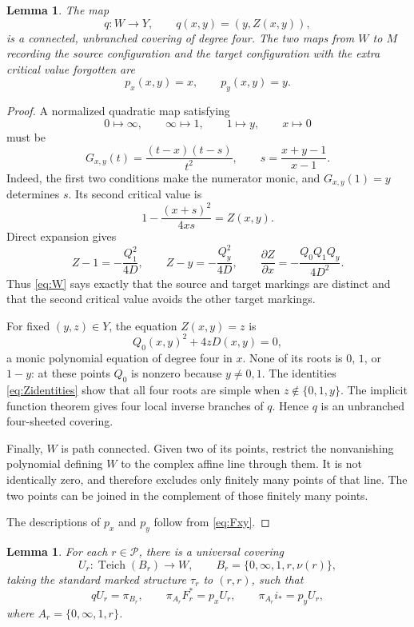 \documentclass[11pt]{article}
\newcommand{\Teich}{\operatorname{Teich}}
\newcommand{\Par}{\mathcal P}
\newtheorem{lemma}[theorem]{Lemma}
\theoremstyle{definition}
\theoremstyle{remark}
\begin{document}
\begin{lemma}\label{lem:cover}
The map
\[
q:W\longrightarrow Y,\qquad q(x,y)=(y,Z(x,y)),
\]
is a connected, unbranched covering of degree four.
The two maps from $W$ to $M$ recording the source configuration and
the target configuration with the extra critical value forgotten are
\[
p_x(x,y)=x,\qquad p_y(x,y)=y.
\]
\end{lemma}

\begin{proof}
A normalized quadratic map satisfying
\[
0\longmapsto\infty,\qquad
\infty\longmapsto1,\qquad
1\longmapsto y,\qquad x\longmapsto0
\]
must be
\begin{equation}\label{eq:Fxy}
G_{x,y}(t)=\frac{(t-x)(t-s)}{t^2},
\qquad s=\frac{x+y-1}{x-1}.
\end{equation}
Indeed, the first two conditions make the numerator monic, and
$G_{x,y}(1)=y$ determines $s$.
Its second critical value is
\[
1-\frac{(x+s)^2}{4xs}=Z(x,y).
\]
Direct expansion gives
\begin{equation}\label{eq:Zidentities}
Z-1=-\frac{Q_1^2}{4D},\qquad
Z-y=-\frac{Q_y^2}{4D},\qquad
\frac{\partial Z}{\partial x}
=-\frac{Q_0Q_1Q_y}{4D^2}.
\end{equation}
Thus \eqref{eq:W} says exactly that the source and target markings
are distinct and that the second critical value avoids the other
target markings.

For fixed $(y,z)\in Y$, the equation $Z(x,y)=z$ is
\[
Q_0(x,y)^2+4zD(x,y)=0,
\]
a monic polynomial equation of degree four in $x$.
None of its roots is $0$, $1$, or $1-y$:
at these points $Q_0$ is nonzero because $y\ne0,1$.
The identities \eqref{eq:Zidentities} show that all four roots are
simple when $z\notin\{0,1,y\}$.  The implicit function theorem gives
four local inverse branches of $q$.  Hence $q$ is an unbranched
four-sheeted covering.

Finally, $W$ is path connected.  Given two of its points, restrict
the nonvanishing polynomial defining $W$ to the complex affine line
through them.  It is not identically zero, and therefore excludes only
finitely many points of that line.  The two points can be joined in
the complement of those finitely many points.

The descriptions of $p_x$ and $p_y$ follow from
\eqref{eq:Fxy}.
\end{proof}

\begin{lemma}\label{lem:teich}
For each $r\in\Par$, there is a universal covering
\[
U_r:\Teich(B_r)\longrightarrow W,\qquad
B_r=\{0,\infty,1,r,\nu(r)\},
\]
taking the standard marked structure $\tau_r$ to $(r,r)$, such that
\begin{equation}\label{eq:coverdiagram}
qU_r=\pi_{B_r},\qquad
\pi_{A_r}F_r^*=p_xU_r,\qquad
\pi_{A_r}i_*=p_yU_r,
\end{equation}
where $A_r=\{0,\infty,1,r\}$.
\end{lemma}
\end{document}
